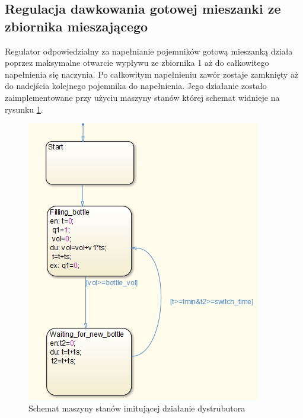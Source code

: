 \subsection{Regulacja dawkowania gotowej mieszanki ze zbiornika mieszającego}
\indent Regulator odpowiedzialny za napełnianie pojemników gotową mieszanką działa poprzez maksymalne otwarcie wypływu ze zbiornika 1 aż do całkowitego napełnienia się naczynia. Po całkowitym napełnieniu zawór zostaje zamknięty aż do nadejścia kolejnego pojemnika do napełnienia. Jego działanie zostało zaimplementowane przy użyciu maszyny stanów której schemat widnieje na rysunku \ref{fig:Dis_state}.
\begin{figure}[H]
	\centering
	\includegraphics[scale = 0.8]{fig/dis_state.png}
	\caption{Schemat maszyny stanów imitującej działanie dystrubutora}
	\label{fig:Dis_state}
\end{figure}

